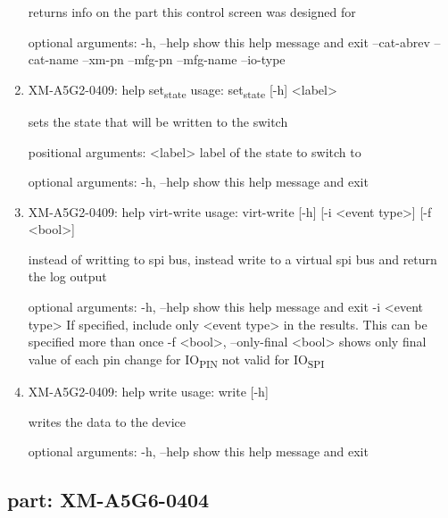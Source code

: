 \documentclass[11pt]{article}
\begin{document}
\begin{enumerate}
returns info on the part this control screen was designed for

optional arguments:
  -h, --help   show this help message and exit
  --cat-abrev
  --cat-name
  --xm-pn
  --mfg-pn
  --mfg-name
  --io-type

\item XM-A5G2-0409: help set\textsubscript{state}
\label{sec:org5b798b7}
usage: set\textsubscript{state} [-h] <label>

sets the state that will be written to the switch

positional arguments:
  <label>     label of the state to switch to

optional arguments:
  -h, --help  show this help message and exit

\item XM-A5G2-0409: help virt-write
\label{sec:orge5a95bc}
usage: virt-write [-h] [-i <event type>] [-f <bool>]

instead of writting to spi bus, instead write to a virtual spi bus and return
the log output

optional arguments:
  -h, --help            show this help message and exit
  -i <event type>       If specified, include only <event type> in the
                        results. This can be specified more than once
  -f <bool>, --only-final <bool>
                        shows only final value of each pin change for IO\textsubscript{PIN}
                        not valid for IO\textsubscript{SPI}

\item XM-A5G2-0409: help write
\label{sec:orgd38474a}
usage: write [-h]

writes the data to the device

optional arguments:
  -h, --help  show this help message and exit
\end{enumerate}

\subsection{part: XM-A5G6-0404}
\label{sec:org42cdff2}
\end{document}
